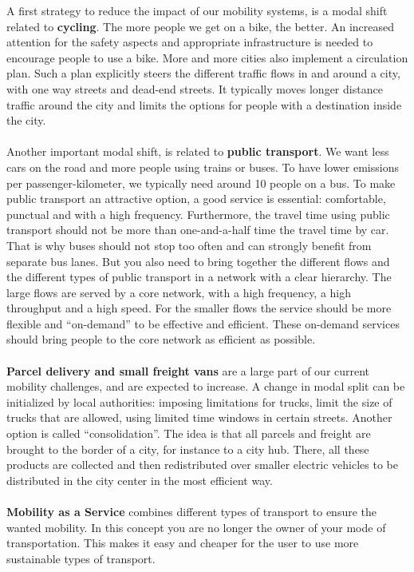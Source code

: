 \documentclass[../summary.tex]{subfiles}
\begin{document}
	A first strategy to reduce the impact of our mobility systems, is a modal shift related to \textbf{cycling}. The more people we get on a bike, the better. An increased attention for the safety aspects and appropriate infrastructure is needed to encourage people to use a bike. More and more cities also implement a circulation plan. Such a plan explicitly steers the different traffic flows in and around a city, with one way streets and dead-end streets. It typically moves longer distance traffic around the city and limits the options for people with a destination inside the city. 
	\\\\
	Another important modal shift, is related to \textbf{public transport}. We want less cars on the road and more people using trains or buses. To have lower emissions per passenger-kilometer, we typically need around 10 people on a bus. To make public transport an attractive option, a good service is essential: comfortable, punctual and with a high frequency. Furthermore, the travel time using public transport should not be more than one-and-a-half time the travel time by car. That is why buses should not stop too often and can strongly benefit from separate bus lanes. But you also need to bring together the different flows and the different types of public transport in a network with a clear hierarchy. The large flows are served by a core network, with a high frequency, a high throughput and a high speed. For the smaller flows the service should be more flexible and “on-demand” to be effective and efficient. These on-demand services should bring people to the core network as efficient as possible.
	\\\\
	\textbf{Parcel delivery and small freight vans} are a large part of our current mobility challenges, and are expected to increase. A change in modal split can be initialized by local authorities: imposing limitations for trucks, limit the size of trucks that are allowed, using limited time windows in certain streets. Another option is called “consolidation”. The idea is that all parcels and freight are brought to the border of a city, for instance to a city hub. There, all these products are collected and then redistributed over smaller electric vehicles to be distributed in the city center in the most efficient way.
	\\\\
	\textbf{Mobility as a Service} combines different types of transport to ensure the wanted mobility. In this concept you are no longer the owner of your mode of transportation. This makes it easy and cheaper for the user to use more sustainable types of transport.
	
\end{document}
